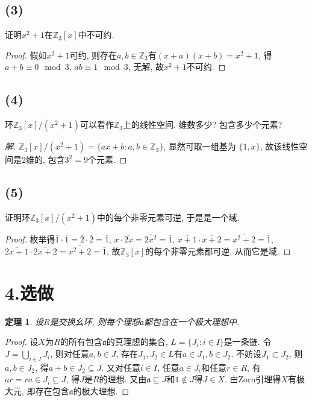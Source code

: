 \documentclass[12pt, a4paper, fontset=windows]{ctexart}
\newcommand{\Z}{\mathbb{Z}}
\newcommand{\cl}[1]{\overline{#1}} %
\newcommand{\xuan}{{\normalsize 选做}}
\newtheorem*{theorem}{定理}
\newenvironment{solution}{\begin{proof}[解]}{\end{proof}}
\begin{document}
\subsection*{(3)}

证明$x^2+1$在$\Z_3[x]$中不可约. 

\begin{proof}
假如$x^2+1$可约, 则存在$a,b\in\Z_3$有$(x+a)(x+b)=x^2+1$, 
得$a+b\equiv 0\mod{3}$, $ab\equiv 1\mod{3}$, 无解, 故$x^2+1$不可约. 
\end{proof}

\subsection*{(4)}

环$\Z_3[x]/(x^2+1)$可以看作$\Z_3$上的线性空间. 维数多少? 包含多少个元素? 

\begin{solution}
$\Z_3[x]/(x^2+1)=\{a\cl{x}+b:a,b\in\Z_3\}$, 显然可取一组基为
$\{1,\cl{x}\}$, 故该线性空间是$2$维的, 包含$3^2=9$个元素. 
\end{solution}

\subsection*{(5)}

证明环$\Z_3[x]/(x^2+1)$中的每个非零元素可逆, 于是是一个域. 

\begin{proof}
枚举得$\cl{1}\cdot\cl{1}=\cl{2}\cdot\cl{2}=\cl{1}$, 
$\cl{x}\cdot\cl{2x}=\cl{2x^2}=\cl{1}$, 
$\cl{x+1}\cdot\cl{x+2}=\cl{x^2+2}=\cl{1}$, 
$\cl{2x+1}\cdot\cl{2x+2}=\cl{x^2+2}=\cl{1}$, 
故$\Z_3[x]$的每个非零元素都可逆, 从而它是域. 
\end{proof}

\section*{4.\xuan}
{
\def\a{\mathfrak{a}}
\begin{theorem}
设$R$是交换幺环, 则每个理想$\a$都包含在一个极大理想中. 
\end{theorem}

\begin{proof}
设$X$为$R$的所有包含$\a$的真理想的集合, $L=\{J_i:i\in I\}$是一条链. 
令$J=\bigcup_{i\in I}J_i$, 则对任意$a,b\in J$, 
存在$J_1,J_2\in L$有$a\in J_1,b\in J_2$. 不妨设$J_1\subset J_2$, 
则$a,b\in J_2$, 得$a+b\in J_2\subseteq J$. 
又对任意$i\in I$, 任意$a\in J_i$和任意$r\in R$, 
有$ar=ra\in J_i\subseteq J$, 得$J$是$R$的理想. 
又由$\a\subseteq J$和$1\notin J$得$J\in X$. 
由Zorn引理得$X$有极大元, 即存在包含$\a$的极大理想. 
\end{proof}
}
\end{document}
